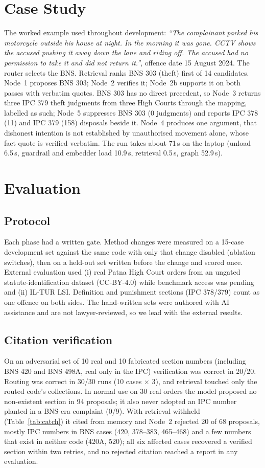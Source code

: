 \documentclass[conference]{IEEEtran}
\begin{document}
\section{Case Study}\label{sec:case}
The worked example used throughout development: \emph{``The complainant parked his motorcycle outside his house at night. In the morning it was gone. CCTV shows the accused pushing it away down the lane and riding off. The accused had no permission to take it and did not return it.''}, offence date 15 August 2024. The router selects the BNS. Retrieval ranks BNS 303 (theft) first of 14 candidates. Node~1 proposes BNS 303; Node~2 verifies it; Node~2b supports it on both passes with verbatim quotes. BNS 303 has no direct precedent, so Node~3 returns three IPC 379 theft judgments from three High Courts through the mapping, labelled as such; Node~5 suppresses BNS 303 (0 judgments) and reports IPC 378 (11) and IPC 379 (158) disposals beside it. Node~4 produces one argument, that dishonest intention is not established by unauthorised movement alone, whose fact quote is verified verbatim. The run takes about 71\,s on the laptop (unload 6.5\,s, guardrail and embedder load 10.9\,s, retrieval 0.5\,s, graph 52.9\,s).

\section{Evaluation}\label{sec:eval}

\subsection{Protocol}
Each phase had a written gate. Method changes were measured on a 15-case development set against the same code with only that change disabled (ablation switches), then on a held-out set written before the change and scored once. External evaluation used (i) real Patna High Court orders from an ungated statute-identification dataset (CC-BY-4.0) while benchmark access was pending and (ii) IL-TUR LSI. Definition and punishment sections (IPC 378/379) count as one offence on both sides. The hand-written sets were authored with AI assistance and are not lawyer-reviewed, so we lead with the external results.

\subsection{Citation verification}
On an adversarial set of 10 real and 10 fabricated section numbers (including BNS 420 and BNS 498A, real only in the IPC) verification was correct in 20/20. Routing was correct in 30/30 runs (10 cases $\times$ 3), and retrieval touched only the routed code's collections. In normal use on 30 real orders the model proposed no non-existent section in 94 proposals; it also never adopted an IPC number planted in a BNS-era complaint (0/9). With retrieval withheld (Table~\ref{tab:catch}) it cited from memory and Node~2 rejected 20 of 68 proposals, mostly IPC numbers in BNS cases (420, 378--383, 465--468) and a few numbers that exist in neither code (420A, 520); all six affected cases recovered a verified section within two retries, and no rejected citation reached a report in any evaluation.
\end{document}
